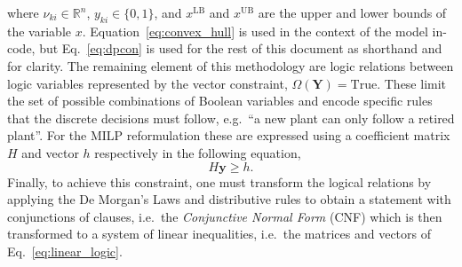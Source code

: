 \documentclass{amsbook}
\begin{document}
%
where $\nu_{ki} \in \mathbb{R}^n$, $y_{ki}\in \{0,1\}$, and $x^{\text{LB}}$ and 
$x^{\text{UB}}$ are the upper and lower bounds of the variable $x$.
Equation~\eqref{eq:convex_hull} is used in the context of the model in-code, but
Eq.~\eqref{eq:dpcon} is used for the rest of this document as shorthand and for
clarity.
%
The remaining element of this methodology are logic relations between logic
variables represented by the vector constraint, $\Omega \left(\bm{Y}\right) =
\text{True}$. These limit the set of possible combinations of Boolean variables
and encode specific rules that the discrete decisions must follow, e.g.\ ``a new
plant can only follow a retired plant''. For the MILP reformulation these are
expressed using a coefficient matrix $H$ and vector $h$ respectively in the
following equation,
%
\begin{equation}\label{eq:linear_logic}
    H \bm{y} \geq h.
\end{equation}
%
Finally, to achieve this constraint, one must transform the logical relations
by applying the De Morgan's Laws and distributive rules to obtain a
statement with conjunctions of clauses, i.e.\ the \emph{Conjunctive Normal Form}
(CNF) which is then transformed to a system of linear inequalities, i.e.\ the
matrices and vectors of Eq.~\eqref{eq:linear_logic}.
%
\end{document}
